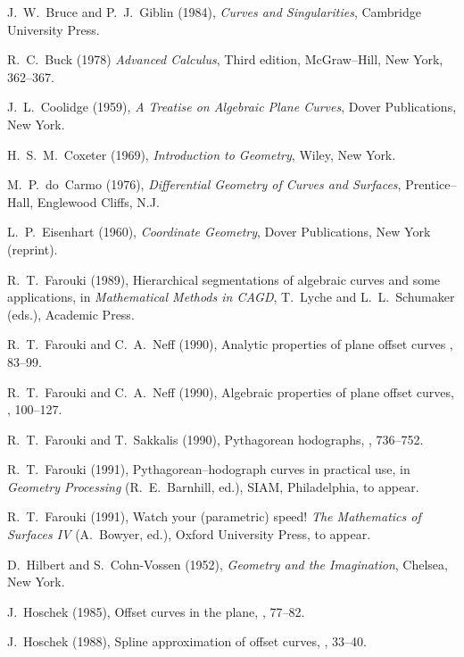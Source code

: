 \begin{thebibliography}{99}

J.~W.~Bruce and P.~J.~Giblin (1984), {\it Curves and Singularities},
Cambridge University Press.

R.~C.~Buck (1978) {\it Advanced Calculus}, Third edition, McGraw--Hill,
New York, 362--367.

J.~L.~Coolidge (1959), {\it A Treatise on Algebraic Plane Curves},
Dover Publications, New York.

H.~S.~M.~Coxeter (1969), {\it Introduction to Geometry}, Wiley,
New York.

M.~P.~do~Carmo (1976), {\it Differential Geometry of Curves and
Surfaces}, Prentice--Hall, Englewood Cliffs, N.J.

L.~P.~Eisenhart (1960), {\it Coordinate Geometry}, Dover Publications,
New York (reprint).

R.~T.~Farouki (1989), Hierarchical segmentations of algebraic curves
and some applications, in {\it Mathematical Methods in CAGD}, T.~Lyche
and L.~L.~Schumaker (eds.), Academic Press.

R.~T.~Farouki and C.~A.~Neff (1990), Analytic properties of plane
offset curves , 83--99.

R.~T.~Farouki and C.~A.~Neff (1990), Algebraic properties of plane
offset curves, , 100--127.

R.~T.~Farouki and T.~Sakkalis (1990), Pythagorean hodographs,
, 736--752.

R.~T.~Farouki (1991), Pythagorean--hodograph curves in practical
use, in {\it Geometry Processing\/} (R.~E.~Barnhill, ed.), SIAM,
Philadelphia, to appear.

R.~T.~Farouki (1991), Watch your (parametric) speed! {\it The
Mathematics of Surfaces IV\/} (A.~Bowyer, ed.), Oxford University
Press, to appear.

D.~Hilbert and S.~Cohn-Vossen (1952),
{\it Geometry and the Imagination},
Chelsea, New York.

J.~Hoschek (1985), Offset curves in the plane, , 77--82.

J.~Hoschek (1988), Spline approximation of offset curves, ,
33--40.


\end{thebibliography}
